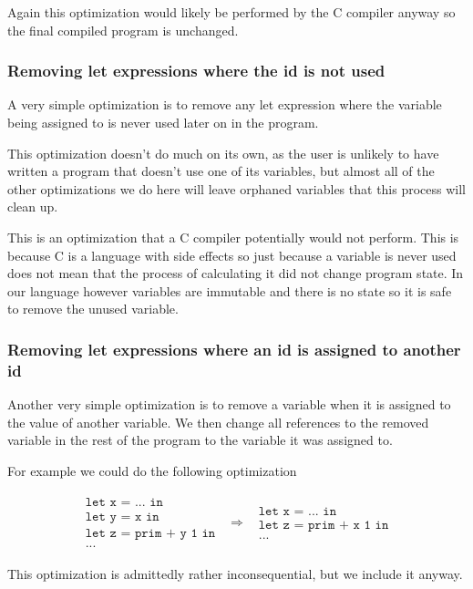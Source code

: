 \documentclass[a4paper]{article}
\newcommand{\optimization}[2]{
	\[
		\begin{array}{rcl}
			#1 & \Rightarrow & #2
		\end{array}
	\]
}
\begin{document}
Again this optimization would likely be performed by the C compiler anyway so the final compiled program is unchanged.




\subsubsection{Removing let expressions where the id is not used}

A very simple optimization is to remove any let expression where the variable being assigned to is never used later on in the program.

This optimization doesn't do much on its own, as the user is unlikely to have written a program that doesn't use one of its variables, but almost all of the other optimizations we do here will leave orphaned variables that this process will clean up.

This is an optimization that a C compiler potentially would not perform. This is because C is a language with side effects so just because a variable is never used does not mean that the process of calculating it did not change program state. In our language however variables are immutable and there is no state so it is safe to remove the unused variable.




\subsubsection{Removing let expressions where an id is assigned to another id}

Another very simple optimization is to remove a variable when it is assigned to the value of another variable. We then change all references to the removed variable in the rest of the program to the variable it was assigned to.

For example we could do the following optimization
\optimization{
	\begin{array}{l}
		\texttt{let x = ... in} \\
		\texttt{let y = x in} \\
		\texttt{let z = prim + y 1 in}\\
		\texttt{...}
	\end{array}
}{
	\begin{array}{l}
		\texttt{let x = ... in} \\
		\texttt{let z = prim + x 1 in}\\
		\texttt{...}
	\end{array}
}
This optimization is admittedly rather inconsequential, but we include it anyway.
\end{document}
